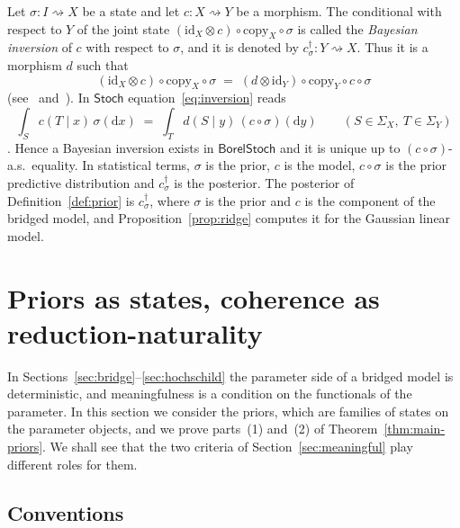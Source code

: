 \documentclass[11pt,a4paper]{article}
\theoremstyle{plain}
\theoremstyle{definition}
\theoremstyle{remark}
\newcommand{\cat}[1]{\mathsf{#1}}
\newcommand{\Stoch}{\cat{Stoch}}
\newcommand{\id}{\mathrm{id}}
\newcommand{\BorelStoch}{\cat{BorelStoch}}
\begin{document}
Let $\sigma \colon I \rightsquigarrow X$ be a state and let
$c \colon X \rightsquigarrow Y$ be a morphism. The conditional with respect to
$Y$ of the joint state $(\id_X \otimes c) \circ \mathrm{copy}_X \circ \sigma$
is called the \emph{Bayesian inversion} of $c$ with respect to $\sigma$, and it
is denoted by $c^{\dagger}_{\sigma} \colon Y \rightsquigarrow X$. Thus it is a
morphism $d$ such that
\begin{equation}\label{eq:inversion}
(\id_X \otimes c)\circ\mathrm{copy}_X\circ\sigma
\;=\;
(d \otimes \id_Y)\circ\mathrm{copy}_Y\circ c\circ\sigma
\end{equation}
(see~\cite[eq.~(5)]{cho_disintegration_2019}
and~\cite[eq.~(13.2)]{fritz_synthetic_2020}). In $\Stoch$
equation~\eqref{eq:inversion} reads
\[
\int_{S} c(T\mid x)\,\sigma(\mathrm{d}x) \;=\;
\int_{T} d(S \mid y)\,(c\circ\sigma)(\mathrm{d}y)
\qquad (S \in \Sigma_X,\ T \in \Sigma_Y)
\]
\cite[Ex.~3.9]{cho_disintegration_2019}. Hence a Bayesian inversion exists in
$\BorelStoch$ and it is unique up to $(c\circ\sigma)$-a.s.\ equality. In
statistical terms, $\sigma$ is the prior, $c$ is the model, $c \circ \sigma$ is
the prior predictive distribution and $c^{\dagger}_{\sigma}$ is the posterior.
The posterior of Definition~\ref{def:prior} is $c^{\dagger}_{\sigma}$, where
$\sigma$ is the prior and $c$ is the component of the bridged model, and
Proposition~\ref{prop:ridge} computes it for the Gaussian linear model.
\section{Priors as states, coherence as reduction-naturality}\label{sec:bayes}

In Sections~\ref{sec:bridge}--\ref{sec:hochschild} the parameter side of a
bridged model is deterministic, and meaningfulness is a condition on the
functionals of the parameter. In this section we consider the priors, which are
families of states on the parameter objects, and we prove parts~(1) and~(2) of
Theorem~\ref{thm:main-priors}. We shall see that the two criteria of
Section~\ref{sec:meaningful} play different roles for them.

\subsection{Conventions}
\end{document}
